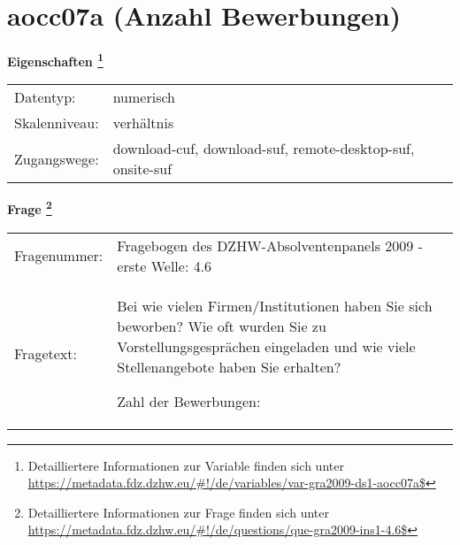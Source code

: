 
    \setcounter{footnote}{0}

    \vspace*{-1.8cm}
	\section{aocc07a (Anzahl Bewerbungen)}
	\label{section:aocc07a}



    \vspace*{0.5cm}
    \noindent\textbf{Eigenschaften
	\footnote{Detailliertere Informationen zur Variable finden sich unter
		\url{https://metadata.fdz.dzhw.eu/\#!/de/variables/var-gra2009-ds1-aocc07a$}}}\\
	\begin{tabularx}{\hsize}{@{}lX}
	Datentyp: & numerisch \\
	Skalenniveau: & verhältnis \\
	Zugangswege: &
	  download-cuf, 
	  download-suf, 
	  remote-desktop-suf, 
	  onsite-suf
 \\
    \end{tabularx}



				\vspace*{0.5cm}
                \noindent\textbf{Frage
	                \footnote{Detailliertere Informationen zur Frage finden sich unter
		              \url{https://metadata.fdz.dzhw.eu/\#!/de/questions/que-gra2009-ins1-4.6$}}}\\
				\begin{tabularx}{\hsize}{@{}lX}
					Fragenummer: &
					  Fragebogen des DZHW-Absolventenpanels 2009 - erste Welle:
					  4.6
 \\
					Fragetext: & Bei wie vielen Firmen/Institutionen haben Sie sich beworben? Wie oft wurden Sie zu Vorstellungsgesprächen eingeladen und wie viele Stellenangebote haben Sie erhalten?\par  Zahl der Bewerbungen: \\
				\end{tabularx}





